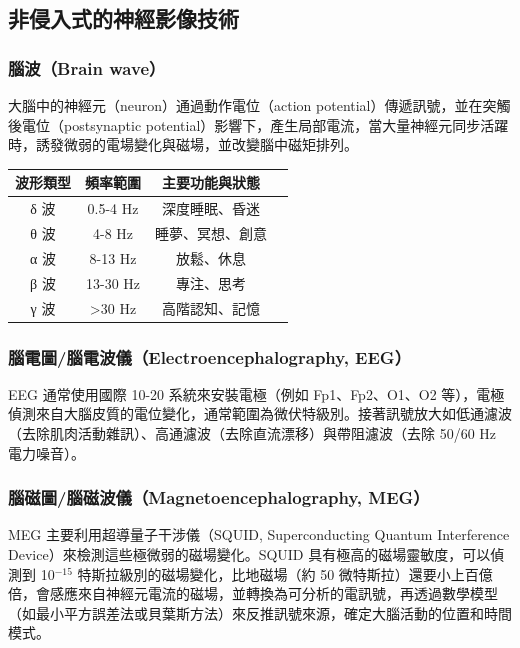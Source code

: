 \documentclass[a4paper,12pt]{report}
\begin{document}
\begin{itemize}
\subsection{非侵入式的神經影像技術}
\subsubsection{腦波（Brain wave）}
大腦中的神經元（neuron）通過動作電位（action potential）傳遞訊號，並在突觸後電位（postsynaptic potential）影響下，產生局部電流，當大量神經元同步活躍時，誘發微弱的電場變化與磁場，並改變腦中磁矩排列。
\begin{longtable}[c]{|c|c|c|c|}
\hline
\textbf{波形類型} & \textbf{頻率範圍} & \textbf{主要功能與狀態} \\\hline
δ 波 & 0.5-4 Hz & 深度睡眠、昏迷\\\hline
θ 波 & 4-8 Hz & 睡夢、冥想、創意\\\hline
α 波 & 8-13 Hz & 放鬆、休息\\\hline
β 波 & 13-30 Hz & 專注、思考\\\hline
γ 波 & >30 Hz & 高階認知、記憶\\\hline
\end{longtable}
\subsubsection{腦電圖/腦電波儀（Electroencephalography, EEG）}
EEG 通常使用國際 10-20 系統來安裝電極（例如 Fp1、Fp2、O1、O2 等），電極偵測來自大腦皮質的電位變化，通常範圍為微伏特級別。接著訊號放大如低通濾波（去除肌肉活動雜訊）、高通濾波（去除直流漂移）與帶阻濾波（去除 50/60 Hz 電力噪音）。
\subsubsection{腦磁圖/腦磁波儀（Magnetoencephalography, MEG）}
MEG 主要利用超導量子干涉儀（SQUID, Superconducting Quantum Interference Device）來檢測這些極微弱的磁場變化。SQUID 具有極高的磁場靈敏度，可以偵測到 10$^{-15}$ 特斯拉級別的磁場變化，比地磁場（約 50 微特斯拉）還要小上百億倍，會感應來自神經元電流的磁場，並轉換為可分析的電訊號，再透過數學模型（如最小平方誤差法或貝葉斯方法）來反推訊號來源，確定大腦活動的位置和時間模式。

\end{itemize}
\end{document}
